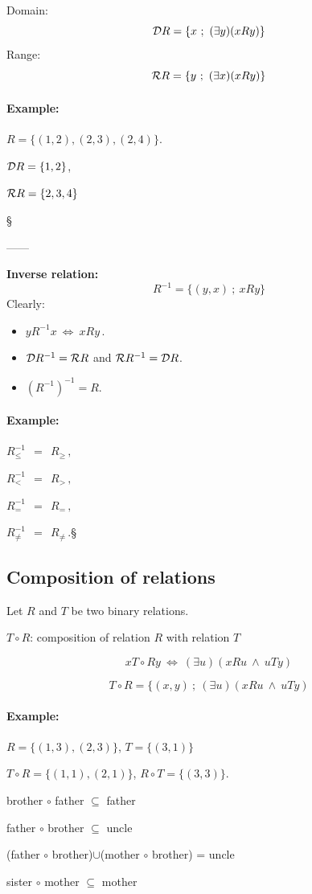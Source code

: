 \documentclass[11pt,paper=b5,footinclude,headinclude]{scrbook} %
\def\inn {{~\wedge~}}
\def\cee {{~\Leftrightarrow~}}
\def\zgled{\paragraph{Example:}}
\def\kz{{\hfill{\S}}}%
\theoremstyle{remark}
\theoremstyle{definition} %
\theoremstyle{theorem} %
\begin{document}
Domain: $${\cal D}R = \{x~;~(\exists y)(xRy)\}$$
Range: $${\cal R}R = \{y~;~(\exists x)(xRy)\}$$

\medskip

\zgled

$R = \{(1,2), (2,3), (2,4)\}$.

${\cal D}R = \{1,2\}$,

${\cal R}R = \{2,3,4\}$

\kz

\bigskip

------

\textbf{ Inverse relation:}
$$R^{-1}= \{(y,x)~;~xRy\}$$
Clearly:
\begin{itemize}
  \item $yR^{-1}x \cee xRy\,.$
  \item ${\cal D}R^{-1} = {\cal R}R$ and ${\cal R}R^{-1} = {\cal D}R$.
    \item $(R^{-1})^{-1} = R$.
\end{itemize}


\bigskip
\zgled

 $R_\le^{-1}~~=~~R_\ge\,,$

 $R_<^{-1}~~=~~R_>\,,$

 $R_=^{-1}~~=~~R_=\,,$

$R_{\neq}^{-1}~~=~~R_{\neq}\,.$\kz

\subsection{Composition of relations}

Let $R$ and $T$ be two binary relations.

$T\circ R$: composition of relation $R$ with relation $T$

$$x T\circ R y \cee (\exists u)(xRu\inn uTy)$$

$$T\circ R = \{(x,y)~;~(\exists u)(xRu\inn uTy)$$


\bigskip
\zgled

$R = \{(1,3),(2,3)\}$, $T = \{(3,1)\}$

$T\circ R = \{(1,1), (2,1)\}$, $R\circ T = \{(3,3)\}$.


\medskip

brother $\circ$ father $\subseteq$ father

father $\circ$ brother  $\subseteq$ uncle

(father $\circ$ brother)$\cup$(mother $\circ$ brother) = uncle

sister $\circ$ mother $\subseteq$  mother
\end{document}
